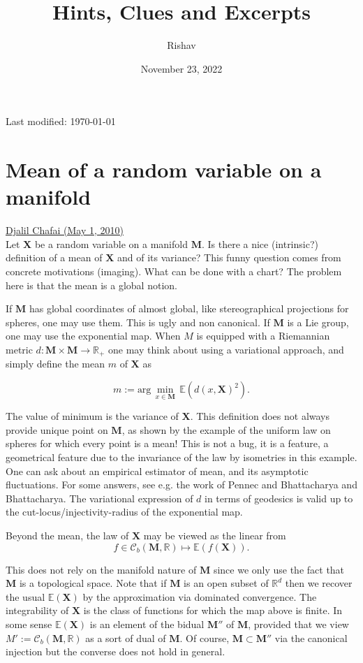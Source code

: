 \documentclass{article}
\title{Hints, Clues and Excerpts}
\date{November 23, 2022}
\author{Rishav}
\begin{document}
\maketitle
\begin{center}
  Last modified: \today{} 
\end{center}
\tableofcontents
\newpage

\section{Mean of a random variable on a manifold}
\href{https://djalil.chafai.net/blog/2010/05/01/mean-of-random-variable-on-manifold/}{Djalil Chafai (May 1, 2010)} \\

Let $\bm{X}$ be a random variable on a manifold $\bm{M}$. Is there a nice (intrinsic?) definition of a mean of $\bm{X}$ and of its variance? This funny question comes from concrete motivations (imaging). What can be done with a chart? The problem here is that the mean is a global notion.\medskip

If $\bm{M}$ has global coordinates of almost global, like stereographical projections for spheres, one may use them. This is ugly and non canonical. If $\bm{M}$ is a Lie group, one may use the exponential map. When $M$ is equipped with a Riemannian metric $d: \bm{M}\times \bm{M} \rightarrow\mathbb{R}_{+}$ one may think about using a variational approach, and simply define the mean $m$ of $\bm{X}$ as

$$
  m:=\text{arg}\,\min\limits_{x\in\bm{M}}\, \mathbb{E}(d(x, \bm{X})^{2}).
$$

The value of minimum is the variance of $\bm{X}$. This definition does not always provide unique point on $\bm{M}$, as shown by the example of the uniform law on spheres for which every point is a mean! This is not a bug, it is a feature, a geometrical feature due to the invariance of the law by isometries in this example. One can ask about an empirical estimator of mean, and its asymptotic fluctuations. For some answers, see e.g. the work of Pennec and Bhattacharya and Bhattacharya. The variational expression of $d$ in terms of geodesics is valid up to the cut-locus/injectivity-radius of the exponential map.\medskip

Beyond the mean, the law of $\bm{X}$ may be viewed as the linear from
$$
  f \in \mathcal{C}_{b}(\bm{M}, \mathbb{R})\mapsto \mathbb{E}(f(\bm{X})).
$$

This does not rely on the manifold nature of $\bm{M}$ since we only use the fact that $\bm{M}$ is a topological space. Note that if $\bm{M}$ is an open subset of $\mathbb{R}^{d}$ then we recover the usual $\mathbb{E}(\bm{X})$ by the approximation via dominated convergence. The integrability of $\bm{X}$ is the class of functions for which the map above is finite. In some sense $\mathbb{E}(\bm{X})$ is an element of the bidual $\bm{M}''$  of $\bm{M}$, provided that we view  $M':=\mathcal{C}_{b}(\bm{M},\mathbb{R})$ as a sort of dual of $\bm{M}$. Of course, $\bm{M}\subset\bm{M}''$ via the canonical injection but the converse does not hold in general. \medskip
\end{document}
